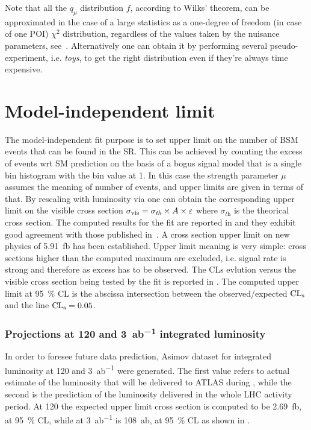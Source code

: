 Note that all the $q_\mu$ distribution $f$, according to Wilks' theorem, can be approximated in the case of a large statistics as a one-degree of freedom (in case of one POI) $\chi^2$ distribution, regardless of the values taken by the nuisance parameters, see~\cite[\!]{Cowan}. Alternatively one can obtain it by performing several pseudo-experiment, i.e. \emph{toys}, to get the right distribution even if they're always time expensive.

\section{Model-independent limit}
The model-independent fit purpose is to set upper limit on the number of BSM events that can be found in the SR. This can be achieved by counting the excess of events wrt SM prediction on the basis of a bogus signal model that is a single bin histogram with the bin value at 1. In this case the strength parameter $\mu$ assumes the meaning of number of events, and upper limits are given in terms of that. By rescaling with luminosity via \Eqn{\ref{eqn:Nevents}} one can obtain the corresponding upper limit on the visible cross section $\sigma_\textup{vis}=\sigma_\textit{th}\times A\times\epsilon$ where $\sigma_\textit{th}$ is the theorical cross section. The computed results for the fit are reported in \Tab{\ref{table.results.exclxsec.pval.upperlimit.SR}} and they exhibit good agreement with those published in~\cite{paperMP}. A cross section upper limit on new physics of \SI{5.91}{fb} has been established. Upper limit meaning is very simple: cross sections higher than the computed maximum are excluded, i.e. signal rate is strong and therefore as excess has to be observed. The CLs evlution versus the visible cross section being tested by the fit is reported in \Fig{\ref{fig:cls}}. The computed upper limit at \SI{95}{\percent} CL is the abscissa intersection between the observed/expected $\cls$ and the line $\cls=0.05$.




\subsubsection{Projections at \SI{120}{\ifb} and \SI{3}{ab^{-1}} integrated luminosity}
 In order to foresee future data prediction, Asimov dataset for integrated luminosity at \SI{120}{\ifb} and \SI{3}{ab^{-1}} were generated. The first value refers to actual estimate of the luminosity that will be delivered to ATLAS during \RunTwo, while the second is the prediction of the luminosity delivered in the whole LHC activity period. At \SI{120}{\ifb} the expected upper limit cross section is computed to be \SI{2.69}{fb}, at \SI{95}{\percent} CL, while at \SI{3}{ab^{-1}} is \SI{108}{ab}, at \SI{95}{\percent} CL as shown in \Tab{\ref{table.results.exclxsec.pval.upperlimit.SR}}.


